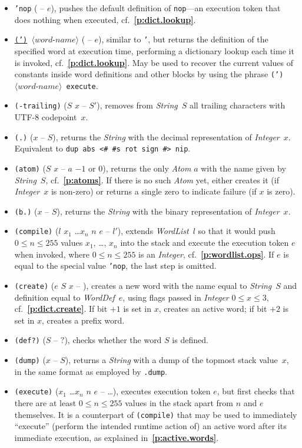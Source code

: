 \documentclass[12pt,oneside]{article}
\def\refpoint#1{{\rm\textbf{\ref{#1}}}}
\let\ptref=\refpoint
\begin{document}
\begin{itemize}
\item {\tt 'nop} ( -- $e$), pushes the default definition of {\tt nop}---an execution token that does nothing when executed, cf.~\ptref{p:dict.lookup}.
\item {\tt \underline{(')} $\langle\textit{word-name}\rangle$} ( -- $e$), similar to {\tt '}, but returns the definition of the specified word at execution time, performing a dictionary lookup each time it is invoked, cf.~\ptref{p:dict.lookup}. May be used to recover the current values of constants inside word definitions and other blocks by using the phrase {\tt (') $\langle\textit{word-name}\rangle$ execute}.
\item {\tt (-trailing)} ($S$ $x$ -- $S'$), removes from {\em String}~$S$ all trailing characters with UTF-8 codepoint~$x$.
\item {\tt (.)} ($x$ -- $S$), returns the {\em String\/} with the decimal representation of {\em Integer\/}~$x$. Equivalent to {\tt dup abs <\# \#s rot sign \#> nip}.
\item {\tt (atom)} ($S$ $x$ -- $a$ $-1$ or $0$), returns the only {\em Atom\/} $a$ with the name given by {\em String\/}~$S$, cf.~\ptref{p:atoms}. If there is no such {\em Atom\/} yet, either creates it (if {\em Integer\/}~$x$ is non-zero) or returns a single zero to indicate failure (if $x$ is zero).
\item {\tt (b.)} ($x$ -- $S$), returns the {\em String\/} with the binary representation of {\em Integer\/}~$x$.
\item {\tt (compile)} ($l$ $x_1$ \dots $x_n$ $n$ $e$ -- $l'$), extends {\em WordList\/}~$l$ so that it would push $0\leq n\leq 255$ values $x_1$, \ldots, $x_n$ into the stack and execute the execution token $e$ when invoked, where $0\leq n\leq 255$ is an {\em Integer}, cf.~\ptref{p:wordlist.ops}. If $e$ is equal to the special value {\tt 'nop}, the last step is omitted.
\item {\tt (create)} ($e$ $S$ $x$ -- ), creates a new word with the name equal to {\em String\/}~$S$ and definition equal to {\em WordDef\/}~$e$, using flags passed in {\em Integer\/} $0\leq x\leq 3$, cf.~\ptref{p:dict.create}. If bit $+1$ is set in $x$, creates an active word; if bit $+2$ is set in $x$, creates a prefix word.
\item {\tt (def?)} ($S$ -- $?$), checks whether the word $S$ is defined.
\item {\tt (dump)} ($x$ -- $S$), returns a {\em String\/} with a dump of the topmost stack value~$x$, in the same format as employed by {\tt .dump}.
\item {\tt (execute)} ($x_1$ \dots $x_n$ $n$ $e$ -- \dots), executes execution token $e$, but first checks that there are at least $0\leq n\leq 255$ values in the stack apart from $n$ and $e$ themselves. It is a counterpart of {\tt (compile)} that may be used to immediately ``execute'' (perform the intended runtime action of) an active word after its immediate execution, as explained in~\ptref{p:active.words}.

\end{itemize}
\end{document}
